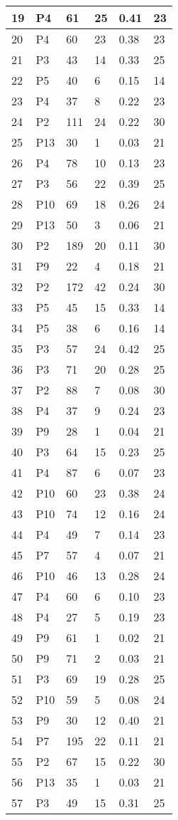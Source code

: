 \begin{table}[tpb]
{\begin{tabular}{|l|l|l|l|l|l|}
19 & P4 & 61 & 25 & 0.41 & 23 \\ \hline
20 & P4 & 60 & 23 & 0.38 & 23 \\ \hline
21 & P3 & 43 & 14 & 0.33 & 25 \\ \hline
22 & P5 & 40 & 6 & 0.15 & 14 \\ \hline
23 & P4 & 37 & 8 & 0.22 & 23 \\ \hline
24 & P2 & 111 & 24 & 0.22 & 30 \\ \hline
25 & P13 & 30 & 1 & 0.03 & 21 \\ \hline
26 & P4 & 78 & 10 & 0.13 & 23 \\ \hline
27 & P3 & 56 & 22 & 0.39 & 25 \\ \hline
28 & P10 & 69 & 18 & 0.26 & 24 \\ \hline
29 & P13 & 50 & 3 & 0.06 & 21 \\ \hline
30 & P2 & 189 & 20 & 0.11 & 30 \\ \hline
31 & P9 & 22 & 4 & 0.18 & 21 \\ \hline
32 & P2 & 172 & 42 & 0.24 & 30 \\ \hline
33 & P5 & 45 & 15 & 0.33 & 14 \\ \hline
34 & P5 & 38 & 6 & 0.16 & 14 \\ \hline
35 & P3 & 57 & 24 & 0.42 & 25 \\ \hline
36 & P3 & 71 & 20 & 0.28 & 25 \\ \hline
37 & P2 & 88 & 7 & 0.08 & 30 \\ \hline
38 & P4 & 37 & 9 & 0.24 & 23 \\ \hline
39 & P9 & 28 & 1 & 0.04 & 21 \\ \hline
40 & P3 & 64 & 15 & 0.23 & 25 \\ \hline
41 & P4 & 87 & 6 & 0.07 & 23 \\ \hline
42 & P10 & 60 & 23 & 0.38 & 24 \\ \hline
43 & P10 & 74 & 12 & 0.16 & 24 \\ \hline
44 & P4 & 49 & 7 & 0.14 & 23 \\ \hline
45 & P7 & 57 & 4 & 0.07 & 21 \\ \hline
46 & P10 & 46 & 13 & 0.28 & 24 \\ \hline
47 & P4 & 60 & 6 & 0.10 & 23 \\ \hline
48 & P4 & 27 & 5 & 0.19 & 23 \\ \hline
49 & P9 & 61 & 1 & 0.02 & 21 \\ \hline
50 & P9 & 71 & 2 & 0.03 & 21 \\ \hline
51 & P3 & 69 & 19 & 0.28 & 25 \\ \hline
52 & P10 & 59 & 5 & 0.08 & 24 \\ \hline
53 & P9 & 30 & 12 & 0.40 & 21 \\ \hline
54 & P7 & 195 & 22 & 0.11 & 21 \\ \hline
55 & P2 & 67 & 15 & 0.22 & 30 \\ \hline
56 & P13 & 35 & 1 & 0.03 & 21 \\ \hline
57 & P3 & 49 & 15 & 0.31 & 25 \\ \hline
\end{tabular}%
}
\end{table}


